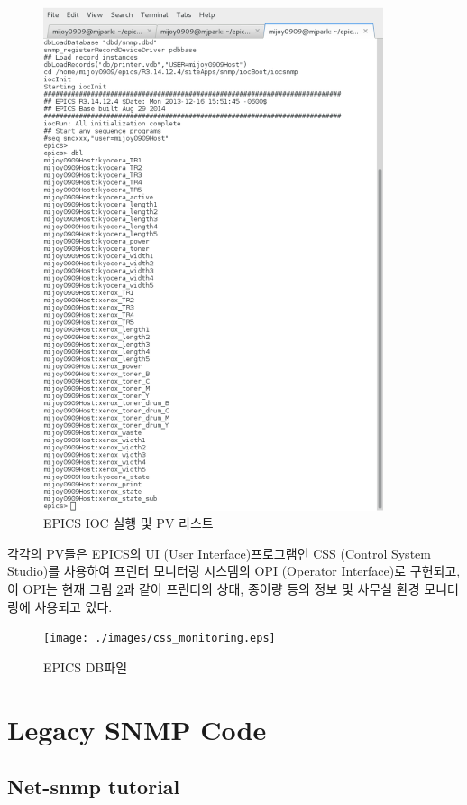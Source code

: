\documentclass[11pt
  , a4paper
  , article
  , oneside
]{memoir}
\begin{document}
\begin{figure}[h!]
  \centering
  	      \includegraphics[width=0.89\textwidth]{./images/printer_ioc.eps}
  \caption{EPICS IOC 실행 및 PV 리스트}
  	      \label{fig: printer_ioc}
\end{figure}

각각의 PV들은 EPICS의 UI (User Interface)프로그램인 CSS (Control System Studio)를 사용하여 프린터 모니터링 시스템의 OPI (Operator Interface)로 구현되고, 이 OPI는 현재 그림 \ref{fig:css_monitoring}과 같이 프린터의 상태, 종이량 등의 정보 및 사무실 환경 모니터링에 사용되고 있다.

\begin{figure}[h!]
  \centering
  \texttt{[image: ./images/css\_monitoring.eps]}
  \caption{EPICS DB파일}
  \label{fig:css_monitoring}   
\end{figure}

\clearpage

\chapter{Legacy SNMP Code}
\section{Net-snmp tutorial}




\clearpage


\end{document}
